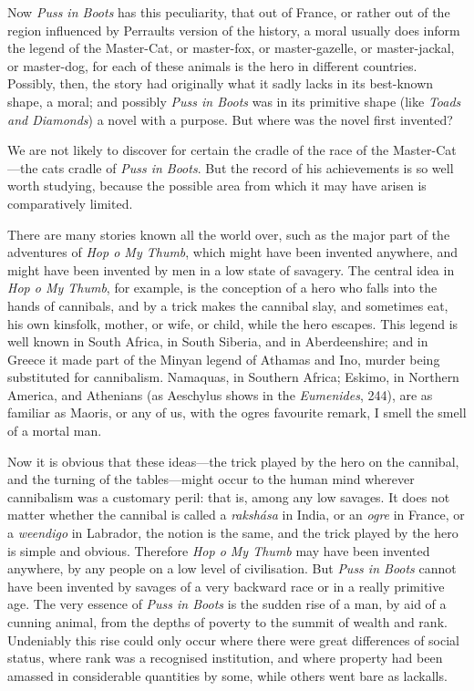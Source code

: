 \documentclass[14pt,a4paper]{memoir}
\begin{document}
{Now \emph{Puss in Boots} has this peculiarity, that out of France, or
rather out of the region influenced by Perrault\textquotesingle s
version of the history, a moral usually does inform the legend of the
Master-Cat, or master-fox, or master-gazelle, or master-jackal, or
master-dog, for each of these animals is the hero in different
countries. Possibly, then, the story had originally what it sadly lacks
in its best-known shape, a moral; and possibly \emph{Puss in Boots} was
in its primitive shape (like \emph{Toads and Diamonds}) a novel with a
purpose. But where was the novel first invented?

We are not likely to discover for certain the cradle of the race of the
Master-Cat---the \textquotesingle cat\textquotesingle s
cradle\textquotesingle{} of \emph{Puss in Boots}. But the record of his
achievements is so well worth studying, because the possible area from
which it may have arisen is comparatively limited.

There are many stories known all the world over, such as the major part
of the adventures of \emph{Hop o\textquotesingle{} My Thumb}, which
might have been invented anywhere, and might have been invented by men
in a low state of savagery. The central idea in \emph{Hop
o\textquotesingle{} My Thumb}, for example, is the conception of a hero
who falls into the hands of cannibals, and by a trick makes the cannibal
slay, and sometimes eat, his own kinsfolk, mother, or wife, or child,
while the hero escapes. This legend is well known in South Africa, in
South Siberia, and in Aberdeenshire; and in Greece it made part of the
Minyan legend of Athamas and Ino, murder being substituted for
cannibalism. Namaquas, in Southern Africa; Eskimo, in Northern America,
and Athenians (as Aeschylus shows in the \emph{Eumenides}, 244), are as
familiar as Maoris, or any of us, with the ogre\textquotesingle s
favourite remark, \textquotesingle I smell the smell of a mortal
man.\textquotesingle{}

Now it is obvious that these ideas---the trick played by the hero on the
cannibal, and the turning of the tables---might occur to the human mind
wherever cannibalism was a customary peril: that is, among any low
savages. It does not matter whether the cannibal is called a
\emph{rakshása} in India, or an \emph{ogre} in France, or a
\emph{weendigo} in Labrador, the notion is the same, and the trick
played by the hero is simple and
obvious.
Therefore \emph{Hop o\textquotesingle{} My Thumb} may have been invented
anywhere, by any people on a low level of civilisation. But \emph{Puss
in Boots} cannot have been invented by savages of a very backward race
or in a really \textquotesingle primitive\textquotesingle{} age. The
very essence of \emph{Puss in Boots} is the sudden rise of a man, by aid
of a cunning animal, from the depths of poverty to the summit of wealth
and rank. Undeniably this rise could only occur where there were great
differences of social status, where rank was a recognised institution,
and where property had been amassed in considerable quantities by some,
while others went bare as lackalls.

}
\end{document}
